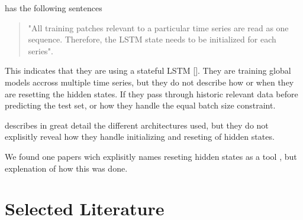 \cite{Bandara2017} has the following sentences
\begin{quotation}
  "All training patches relevant to a particular time series are read as one
  sequence. Therefore, the LSTM state needs to be initialized for each
  series".

\end{quotation}
This indicates that they are using a stateful LSTM [].
They are training global models accross multiple time series, but they do not
describe how or when they are resetting the hidden states.
If they pass through historic relevant data before predicting
the test set, or how they handle the equal batch size constraint.

\cite{Hewamalage2021} describes in great detail the different architectures used,
but they do not explisitly reveal how they handle initializing and reseting
of hidden states.

We found one papers wich explisitly names reseting hidden states
as a tool \cite{Smyl2020}, but explenation of how this was done.


\section{Selected Literature}
